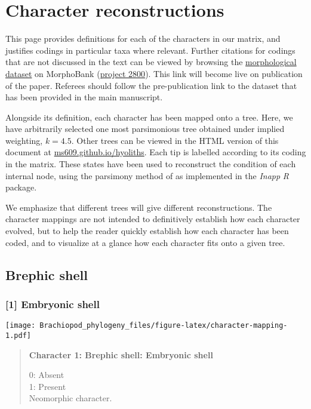 \documentclass[openany]{book}
\theoremstyle{definition}
\theoremstyle{definition}
\theoremstyle{definition}
\theoremstyle{remark}
\begin{document}
\clearpage

\hypertarget{reconstructions}{\chapter{Character
reconstructions}\label{reconstructions}}

This page provides definitions for each of the characters in our matrix,
and justifies codings in particular taxa where relevant. Further
citations for codings that are not discussed in the text can be viewed
by browsing the \protect\hyperlink{dataset}{morphological dataset} on
MorphoBank (\href{https://morphobank.org/permalink/?P2800}{project
2800}). This link will become live on publication of the paper. Referees
should follow the pre-publication link to the dataset that has been
provided in the main manuscript.

Alongside its definition, each character has been mapped onto a tree.
Here, we have arbitrarily selected one most parsimonious tree obtained
under implied weighting, \(k = 4.5\). Other trees can be viewed in the
HTML version of this document at
\href{https://ms609.github.io/hyoliths/reconstructions.html}{ms609.github.io/hyoliths}.
Each tip is labelled according to its coding in the matrix. These states
have been used to reconstruct the condition of each internal node, using
the parsimony method of \citet{Brazeau2018} as implemented in the
\emph{Inapp} \emph{R} package.

We emphasize that different trees will give different reconstructions.
The character mappings are not intended to definitively establish how
each character evolved, but to help the reader quickly establish how
each character has been coded, and to visualize at a glance how each
character fits onto a given tree.

\section{Brephic shell}\label{brephic-shell}

\subsection*{{[}1{]} Embryonic shell}\label{embryonic-shell}

\texttt{[image: Brachiopod\_phylogeny\_files/figure-latex/character-mapping-1.pdf]}

\begin{quote}
\textbf{Character 1: Brephic shell: Embryonic shell}

0: Absent\\
1: Present\\
Neomorphic character.
\end{quote}
\end{document}
